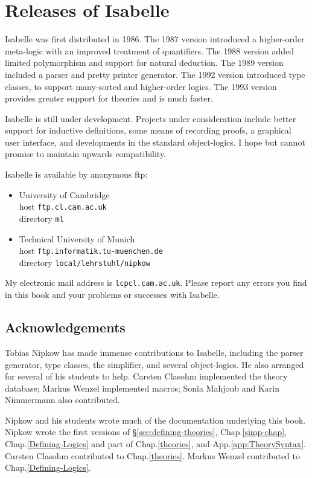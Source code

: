 \section*{Releases of Isabelle}
Isabelle was first distributed in 1986.  The 1987 version introduced a
higher-order meta-logic with an improved treatment of quantifiers.  The
1988 version added limited polymorphism and support for natural deduction.
The 1989 version included a parser and pretty printer generator.  The 1992
version introduced type classes, to support many-sorted and higher-order
logics.  The 1993 version provides greater support for theories and is
much faster.  

Isabelle is still under development.  Projects under consideration include
better support for inductive definitions, some means of recording proofs, a
graphical user interface, and developments in the standard object-logics.
I hope but cannot promise to maintain upwards compatibility.

Isabelle is available by anonymous ftp:
\begin{itemize}
\item University of Cambridge\\
        host {\tt ftp.cl.cam.ac.uk}\\
        directory {\tt ml}

\item Technical University of Munich\\
        host {\tt ftp.informatik.tu-muenchen.de}\\
        directory {\tt local/lehrstuhl/nipkow}
\end{itemize}
My electronic mail address is {\tt lcp\at cl.cam.ac.uk}.  Please report any
errors you find in this book and your problems or successes with Isabelle.


\subsection*{Acknowledgements} 
Tobias Nipkow has made immense contributions to Isabelle, including the
parser generator, type classes, the simplifier, and several object-logics.
He also arranged for several of his students to help.  Carsten Clasohm
implemented the theory database; Markus Wenzel implemented macros; Sonia
Mahjoub and Karin Nimmermann also contributed.  

Nipkow and his students wrote much of the documentation underlying this
book.  Nipkow wrote the first versions of \S\ref{sec:defining-theories},
Chap.\ts\ref{simp-chap}, Chap.\ts\ref{Defining-Logics} and part of
Chap.\ts\ref{theories}, and App.\ts\ref{app:TheorySyntax}.  Carsten Clasohm
contributed to Chap.\ts\ref{theories}.  Markus Wenzel contributed to
Chap.\ts\ref{Defining-Logics}.

